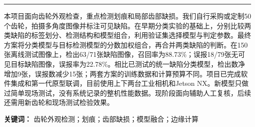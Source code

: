 \thispagestyle{plain}
\par
\vspace{1.1cm}
\vspace{0.2cm}
\vspace{0.55cm}
\par
\vspace{0.4cm}
\par
\vspace{0.55cm}
\noindent\textcolor{GearTeal}{\rule{\linewidth}{1.1pt}}\par
\vspace{0.4cm}
\par\medskip
本项目面向齿轮外观检查，重点检测划痕和局部齿部缺损。我们自行采购或定制50个齿轮，拍摄多角度图像并标注可见缺陷。在早期分类实验的基础上，分别比较两类缺陷的标签划分、检测结构和模型组合，利用验证集选择模型与判定参数。最终方案将分类模型与目标检测模型的分数加权组合，再合并两类缺陷的判断。在150张离线测试图像上，检出63/71张缺陷图像，召回率为88.73\%；误报18/79张无可见目标缺陷图像，误报率为22.78\%。相比已测试的统一缺陷分类模型，检出数净增加9张，误报数减少15张；两套方案的训练数据和计算预算不同。项目已完成软件集成和第一代原型联调，目前使用上下两台工业相机和Jetson NX。新模型只做过简单现场测试，没有系统记录的整机性能数据。现阶段面向辅助人工复核，后续还需用新齿轮和现场测试检验效果。

\textbf{关键词：} 齿轮外观检测；划痕；齿部缺损；模型融合；边缘计算

